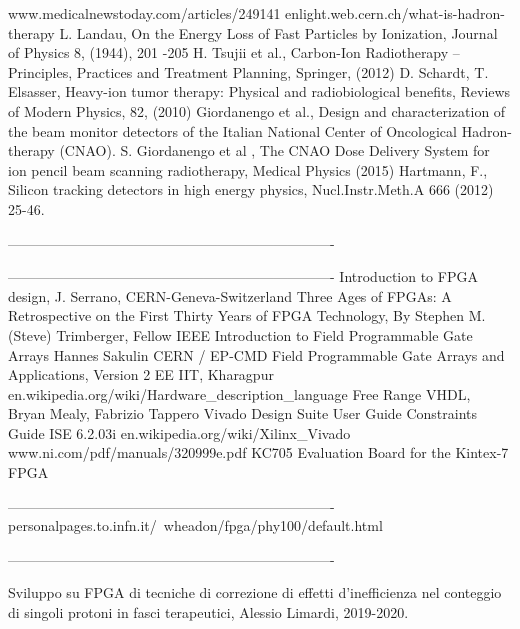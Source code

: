 \begin{thebibliography}{00}	
	www.medicalnewstoday.com/articles/249141
	enlight.web.cern.ch/what-is-hadron-therapy
	L. Landau, On the Energy Loss of Fast Particles by Ionization, Journal of
	Physics 8, (1944), 201 -205
	H. Tsujii et al., Carbon-Ion Radiotherapy – Principles, Practices and Treatment
	Planning, Springer, (2012)
	D. Schardt, T. Elsasser, Heavy-ion tumor therapy: Physical and radiobiological
	benefits, Reviews of Modern Physics, 82, (2010)
	Giordanengo et al., Design and characterization of the beam monitor detectors
	of the Italian National Center of Oncological Hadron-therapy (CNAO).
	S. Giordanengo et al , The CNAO Dose Delivery System for ion pencil beam
	scanning radiotherapy, Medical Physics (2015)
	Hartmann, F., Silicon tracking detectors in high energy physics, Nucl.Instr.Meth.A
	666 (2012) 25-46.
	
	----------------------------------------------------------------------
	
	----------------------------------------------------------------------
	Introduction to FPGA design, J. Serrano, CERN-Geneva-Switzerland
	Three Ages of FPGAs: A Retrospective on the First Thirty Years of FPGA Technology, By Stephen M. (Steve) Trimberger, Fellow IEEE
	Introduction to Field Programmable Gate Arrays Hannes Sakulin CERN / EP-CMD
	Field Programmable Gate Arrays and Applications, Version 2 EE IIT, Kharagpur
	en.wikipedia.org/wiki/Hardware\_description\_language
	Free Range VHDL, Bryan Mealy, Fabrizio Tappero
	Vivado Design Suite User Guide
	Constraints Guide ISE 6.2.03i
	en.wikipedia.org/wiki/Xilinx\_Vivado
	www.ni.com/pdf/manuals/320999e.pdf
	KC705 Evaluation Board for the Kintex-7 FPGA	
	
	
	----------------------------------------------------------------------
	personalpages.to.infn.it/~wheadon/fpga/phy100/default.html
	
	----------------------------------------------------------------------
	
	Sviluppo su FPGA di tecniche di correzione di effetti d'inefficienza nel conteggio di singoli protoni in fasci terapeutici, Alessio Limardi, 2019-2020.
	
\end{thebibliography}
